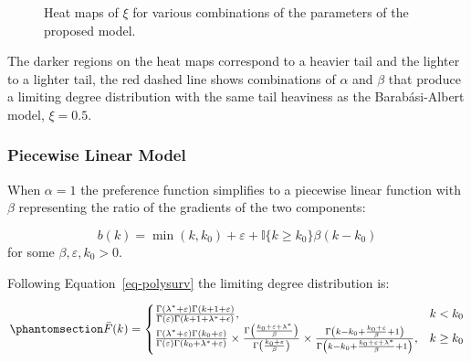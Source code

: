 \documentclass[
  sn-basic,
]{sn-jnl}
\theoremstyle{plain}
\theoremstyle{remark}
\begin{document}
\begin{figure}[H]


\caption{\label{fig-polyheat}Heat maps of \(\xi\) for various
combinations of the parameters of the proposed model.}

\end{figure}%

The darker regions on the heat maps correspond to a heavier tail and the
lighter to a lighter tail, the red dashed line shows combinations of
\(\alpha\) and \(\beta\) that produce a limiting degree distribution
with the same tail heaviness as the Barabási-Albert model, \(\xi=0.5\).

\subsubsection{Piecewise Linear Model}\label{piecewise-linear-model}

When \(\alpha = 1\) the preference function simplifies to a piecewise
linear function with \(\beta\) representing the ratio of the gradients
of the two components:

\[
b(k) = \min(k,k_0) + \varepsilon + \mathbb I\{k\ge k_0\}\beta(k-k_0)
\] for some \(\beta, \varepsilon, k_0>0\).

Following Equation~\ref{eq-polysurv} the limiting degree distribution
is:

\begin{equation}\phantomsection\label{eq-linsurv}{
\bar F(k) = \begin{cases}
\frac{\Gamma(\lambda^*+\varepsilon)\Gamma(k+1+\varepsilon)}{\Gamma(\varepsilon)\Gamma(k+1+\lambda^*+\epsilon)},&k<k_0\\
\frac{\Gamma(\lambda^*+\varepsilon)\Gamma(k_0+\varepsilon)}{\Gamma(\varepsilon)\Gamma(k_0+\lambda^*+\varepsilon)}\times \frac{\Gamma\left(\frac{k_0+\varepsilon+\lambda^*}{\beta}\right)}{\Gamma\left(\frac{k_0+\varepsilon}{\beta}\right)}\times\frac{\Gamma\left(k-k_0 + \frac{k_0+\varepsilon}{\beta}+1\right)}{\Gamma\left(k-k_0 + \frac{k_0+\varepsilon+\lambda^*}{\beta}+1\right)},&k\ge k_0
\end{cases}
}\end{equation}
\end{document}
